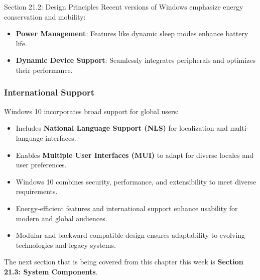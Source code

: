\begin{notes}{Section 21.2: Design Principles}
    Recent versions of Windows emphasize energy conservation and mobility:
    \begin{itemize}
        \item \textbf{Power Management}: Features like dynamic sleep modes enhance battery life.
        \item \textbf{Dynamic Device Support}: Seamlessly integrates peripherals and optimizes their performance.
    \end{itemize}
    
    \subsubsection*{International Support}
    
    Windows 10 incorporates broad support for global users:
    \begin{itemize}
        \item Includes \textbf{National Language Support (NLS)} for localization and multi-language interfaces.
        \item Enables \textbf{Multiple User Interfaces (MUI)} to adapt for diverse locales and user preferences.
    \end{itemize}
    
    \begin{highlight}
    \begin{itemize}
        \item Windows 10 combines security, performance, and extensibility to meet diverse requirements.
        \item Energy-efficient features and international support enhance usability for modern and global audiences.
        \item Modular and backward-compatible design ensures adaptability to evolving technologies and legacy systems.
    \end{itemize}
    \end{highlight}
\end{notes}

The next section that is being covered from this chapter this week is \textbf{Section 21.3: System Components}.

